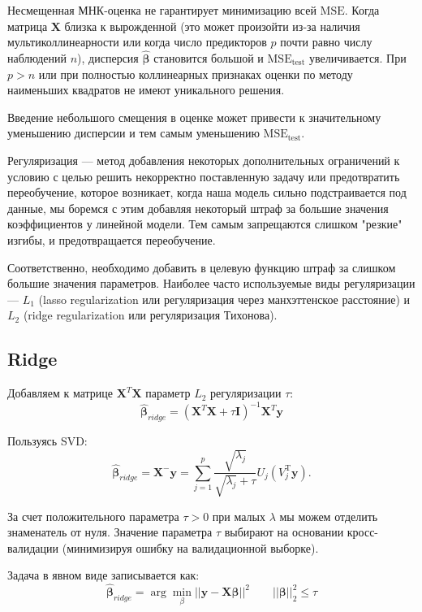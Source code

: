 \documentclass[12pt]{article}
\newcommand{\betah}{\hat{\bm \beta}}
\newcommand{\betaa}{\bm{\beta}}
\newcommand{\X}{\bm{X}}
\newcommand{\y}{\bm{y}}
\begin{document}
	Несмещенная МНК-оценка не гарантирует минимизацию всей $\mathrm{MSE}$.
	Когда матрица $\bm{X}$ близка к вырожденной (это может произойти из-за наличия мультиколлинеарности или когда число предикторов $p$ почти равно числу наблюдений $n$), дисперсия $\hat{\bm \beta}$ становится большой и $\mathrm{MSE}_{\mathrm{test}}$ увеличивается.  При $p>n$ или при полностью коллинеарных признаках оценки по методу наименьших квадратов не имеют уникального решения.
	
	Введение небольшого смещения в оценке может привести к значительному уменьшению дисперсии и тем самым уменьшению $\mathrm{MSE}_{\text{test}}$.
	
	
	Регуляризация --- метод добавления некоторых дополнительных ограничений к условию с целью решить некорректно поставленную задачу или предотвратить переобучение, которое возникает, когда наша модель сильно подстраивается под данные, мы боремся с этим добавляя некоторый штраф за большие значения коэффициентов у линейной модели. Тем самым запрещаются слишком "резкие" изгибы, и предотвращается переобучение.
	
	Соответственно, необходимо добавить в целевую функцию штраф за слишком большие значения параметров. Наиболее часто используемые виды регуляризации — $L_1$ (lasso regularization или регуляризация через манхэттенское расстояние) и $L_2$ (ridge regularization или регуляризация Тихонова).
	
	\subsection{Ridge}
	Добавляем к матрице  $\X^T \X$ параметр $L_2$ регуляризации $\tau$:
	\begin{equation}\label{ridgeMatrix}
		\betah_{ridge} = (\X^T \X + \tau \bm I)^{-1} \X^T \y
	\end{equation}

	Пользуясь SVD:
	\begin{equation}\label{ridgeB}
			\betah_{ridge} =\mathbf{X}^{-}\bm y
		=
		\sum_{j=1}^{p}
		\frac{\sqrt{\lambda_{j}}}{\sqrt{\lambda_{j}}+\tau}
		U_{j}(V_{j}^{\mathrm{T}} \bm y).
	\end{equation}
	
	За счет положительного параметра $\tau > 0$ при малых $\lambda$ мы можем отделить знаменатель от нуля. Значение параметра $\tau$ выбирают на основании кросс-валидации (минимизируя ошибку на валидационной выборке).
	
	Задача в явном виде записывается как:
	\begin{equation}\label{ridgeTask1}
		\betah_{ridge} = \arg \min _{{\beta}} || \y - \X \betaa ||^2
		\qquad
		|| \betaa ||_2^2 \leq \tau
	\end{equation}
\end{document}

